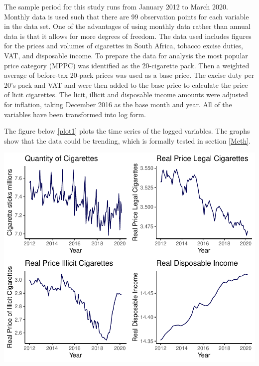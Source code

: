 \documentclass[11pt,preprint, authoryear]{elsarticle}
\let\origfigure\figure
\let\endorigfigure\endfigure
\renewenvironment{figure}[1][2] {
    \expandafter\origfigure\expandafter[H]
} {
    \endorigfigure
}
\numberwithin{equation}{section}
\numberwithin{figure}{section}
\numberwithin{table}{section}
\begin{document}
The sample period for this study runs from January 2012 to March 2020.
Monthly data is used such that there are 99 observation points for each
variable in the data set. One of the advantages of using monthly data
rather than annual data is that it allows for more degrees of freedom.
The data used includes figures for the prices and volumes of cigarettes
in South Africa, tobacco excise duties, VAT, and disposable income. To
prepare the data for analysis the most popular price category (MPPC) was
identified as the 20-cigarette pack. Then a weighted average of
before-tax 20-pack prices was used as a base price. The excise duty per
20's pack and VAT and were then added to the base price to calculate the
price of licit cigarettes. The licit, illicit and disposable income
amounts were adjusted for inflation, taking December 2016 as the base
month and year. All of the variables have been transformed into log
form.

The figure below \ref{plot1} plots the time series of the logged
variables. The graphs show that the data could be trending, which is
formally tested in section \ref{Meth}.

\begin{figure}

{\centering \includegraphics{Thesis_Draft_files/figure-latex/Figure2-1} 

}

\caption{Time Series Plot \label{plot1}}\label{fig:Figure2}
\end{figure}
\end{document}
